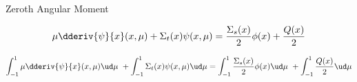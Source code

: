 
\begin{frame}{Zeroth Angular Moment}



    \onslide<+->
    \begin{equation*}
            \mu \dderiv{\psi}{x}(x, \mu) + 
            \Sigma_t(x) \psi(x,\mu) = 
            \frac{\Sigma_s(x)}{2} \phi(x) + 
            \frac{Q(x)}{2} 
    \end{equation*}

    \small
    \onslide<+->
    \begin{equation*}
        \int_{-1}^{1} \mu \dderiv{\psi}{x}(x, \mu) \ud \mu \ + 
        \int_{-1}^{1} \Sigma_t(x) \psi(x,\mu) \ud \mu = 
        \int_{-1}^{1} \frac{\Sigma_s(x)}{2} \phi(x) \ud \mu \ + 
        \int_{-1}^{1} \frac{Q(x)}{2} \ud \mu 
    \end{equation*}






\end{frame}
